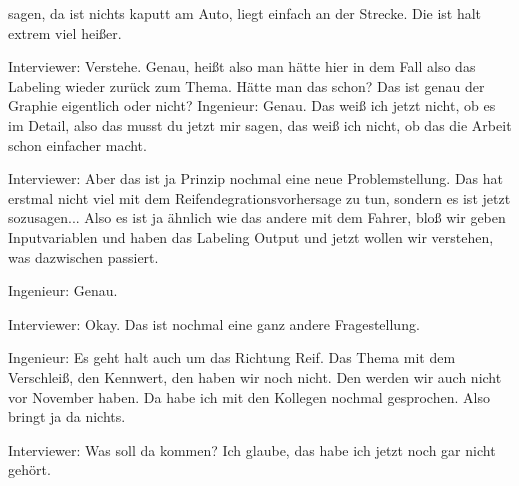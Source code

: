 sagen, da ist nichts kaputt am Auto, liegt einfach an der Strecke. Die ist halt extrem viel heißer. 

Interviewer:
Verstehe. Genau, heißt also man hätte hier in dem Fall also  das Labeling wieder zurück zum Thema. Hätte man das schon? Das ist genau der Graphie eigentlich oder nicht? 
Ingenieur:
Genau. Das  weiß ich jetzt nicht, ob es im Detail, also das musst du jetzt mir sagen, das weiß ich nicht, ob das die Arbeit schon einfacher macht. 

Interviewer:
Aber das ist ja Prinzip nochmal eine neue Problemstellung. Das hat erstmal nicht viel mit dem Reifendegrationsvorhersage zu tun, sondern es ist jetzt sozusagen...  Also es ist ja ähnlich wie das andere mit dem Fahrer, bloß wir  geben Inputvariablen und haben das Labeling Output und jetzt wollen wir verstehen, was dazwischen passiert. 

Ingenieur:
Genau. 

Interviewer:
Okay. Das ist nochmal eine ganz andere Fragestellung.   

Ingenieur:
Es geht halt auch um das Richtung Reif.  Das Thema mit dem Verschleiß, den Kennwert, den haben wir noch nicht. Den werden wir auch nicht vor November haben. Da habe ich mit den Kollegen nochmal gesprochen.  Also bringt ja da nichts.  

Interviewer: 
Was soll da kommen? Ich  glaube, das habe ich jetzt noch gar nicht gehört. 

